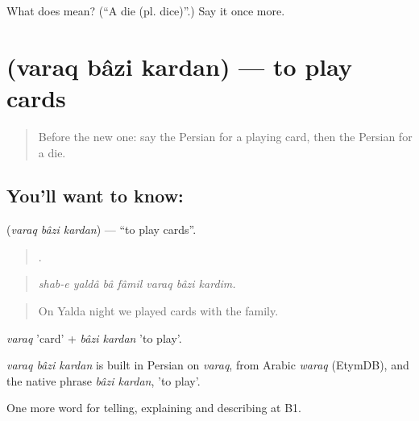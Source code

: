 \begin{tcolorbox}[breakable,colback=teal!4,colframe=teal!35!black,title={Before you move on}]
What does  mean? (\textquotedblleft{}A die (pl. dice)\textquotedblright{}.) Say it once more.
\end{tcolorbox}
\section[\texorpdfstring{\fa{ورق} \fa{بازی} \fa{کردن} (varaq bâzi kardan)}{ورق بازی کردن (varaq bâzi kardan)}]{   (varaq bâzi kardan) — to play cards}

\label{lesson:FA-C509-varaq-bazi-kardan}



\begin{quote}
Before the new one: say the Persian for a playing card, then the Persian for a die.
\end{quote}

\subsection*{You'll want to know:   }
\textbf{  } (\emph{varaq bâzi kardan}) — \textquotedblleft{}to play cards\textquotedblright{}.

\begin{quote}
      .
\end{quote}

\begin{quote}
\emph{shab-e yaldâ bâ fâmil varaq bâzi kardim.}
\end{quote}

\begin{quote}
On Yalda night we played cards with the family.
\end{quote}

\emph{varaq} 'card' + \emph{bâzi kardan} 'to play'.

\begin{cousinweb}
\emph{varaq bâzi kardan} is built in Persian on \emph{varaq}, from Arabic \emph{waraq} (EtymDB), and the native phrase \emph{bâzi kardan}, 'to play'.
\end{cousinweb}

\begin{grammarlens}[title={What you've built}]
One more word for telling, explaining and describing at B1.
\end{grammarlens}

